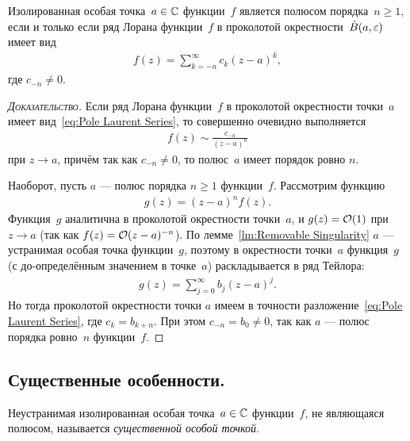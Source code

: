 \documentclass[../complex-analysis.tex]{subfiles}
\begin{document}
\begin{thm}
 \label{theorem:Pole}
 Изолированная особая точка~$ a\in\mathbb{C} $ функции~$ f $ является полюсом порядка~$ n \geqslant 1 $, если и только если ряд Лорана функции~$ f $ в проколотой окрестности~$ \dot B(a,\varepsilon) $ имеет вид
 \begin{align}
  \label{eq:Pole Laurent Series}
  f(z) = \sum_{k=-n}^{\infty} c_k(z-a)^{k},
 \end{align} где $ c_{-n} \neq 0 $.
\end{thm}
\begin{proof}[\normalfont\textsc{Доказательство}]
 Если ряд Лорана функции~$ f $ в проколотой окрестности точки~$ a $ имеет вид~\eqref{eq:Pole Laurent Series}, то совершенно очевидно выполняется
 \begin{align*}
  f(z) \sim \frac{c_{-n}}{(z-a)^{n}}
 \end{align*} при $ z \to a $, причём так как $ c_{-n} \neq 0 $, то полюс~$ a $ имеет порядок ровно $ n $.

 Наоборот, пусть $ a $ --- полюс порядка $ n \geqslant 1 $ функции~$ f $. Рассмотрим функцию
 \begin{align*}
  g(z) = (z-a)^{n}f(z).
 \end{align*} Функция~$ g $ аналитична в проколотой окрестности точки~$ a $, и $ g(z) = \mathcal{O}(1) $ при $ z \to a $ (так как $ f(z) = \mathcal{O}(z-a)^{-n} $). По лемме~\ref{lm:Removable Singularity} $ a $ --- устранимая особая точка функции~$ g $, поэтому в окрестности точки~$ a $ функция~$ g $ (с до-определённым значением в точке~$ a $) раскладывается в ряд Тейлора:
 \begin{align*}
  g(z) = \sum_{j=0}^{\infty} b_j(z-a)^{j}.
 \end{align*} Но тогда проколотой окрестности точки $ a $ имеем в точности разложение~\eqref{eq:Pole Laurent Series}, где $ c_k = b_{k+n} $. При этом $ c_{-n} = b_0 \neq 0 $, так как $ a $ --- полюс порядка ровно~$ n $ функции~$ f $.
\end{proof}

\subsection{Существенные особенности.}

\begin{df}
 Неустранимая изолированная особая точка~$ a\in\mathbb{C} $ функции~$ f $, не являющаяся полюсом, называется \emph{существенной особой точкой}.
\end{df}
\end{document}
